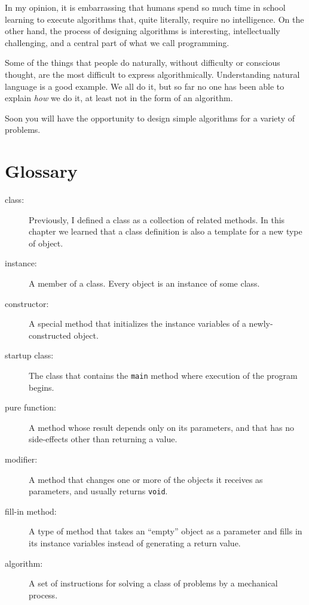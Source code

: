\documentclass[12pt]{book}
\theoremstyle{exercise}
\begin{document}
In my opinion, it is embarrassing that humans spend so much
time in school learning to execute algorithms that,
quite literally, require no intelligence.
%
On the other hand, the process of designing algorithms is
interesting, intellectually challenging, and a central part
of what we call programming.

Some of the things that people do naturally, without difficulty
or conscious thought, are the most difficult to express
algorithmically.  Understanding natural language is a good
example.  We all do it, but so far no one has been able to
explain {\em how} we do it, at least not in the form of an
algorithm.

Soon you will have the opportunity to design
simple algorithms for a variety of problems.


\section{Glossary}

\begin{description}

\item[class:]  Previously, I defined a class as a collection
of related methods.  In this chapter we learned that a class
definition is also a template for a new type of object.

\item[instance:]  A member of a class.  Every object is an
instance of some class.

\item[constructor:]  A special method that initializes the instance
variables of a newly-constructed object.

\item[startup class:]  The class that contains the {\tt main}
method where execution of the program begins.

\item[pure function:]  A method whose result depends only on its
parameters, and that has no side-effects other than returning
a value.

\item[modifier:]  A method that changes one or more of the objects
it receives as parameters, and usually returns {\tt void}.

\item[fill-in method:]  A type of method that takes an ``empty''
object as a parameter and fills in its instance variables instead
of generating a return value.

\item[algorithm:]  A set of instructions for solving a class of
problems by a mechanical process.


\end{description}
\end{document}
